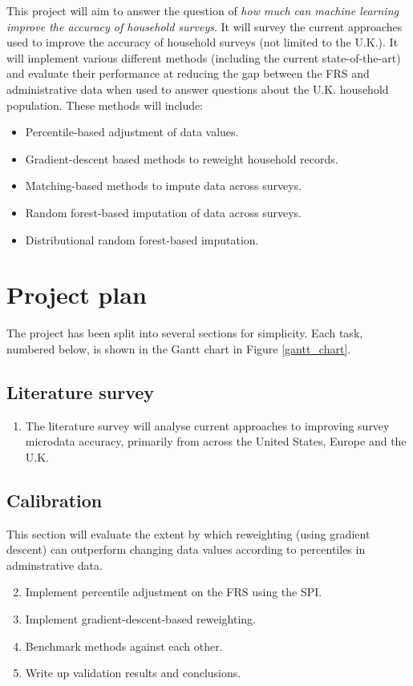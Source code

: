 \documentclass[twocolumn]{article}
\begin{document}
This project will aim to answer the question of \emph{how much can machine learning improve the accuracy of household surveys}. It will survey the current approaches used to improve the accuracy of household surveys (not limited to the U.K.). It will implement various different methods (including the current state-of-the-art) and evaluate their performance at reducing the gap between the FRS and administrative data when used to answer questions about the U.K. household population. These methods will include:
\begin{itemize}
    \item Percentile-based adjustment of data values.
    \item Gradient-descent based methods to reweight household records.
    \item Matching-based methods to impute data across surveys.
    \item Random forest-based imputation of data across surveys.
    \item Distributional random forest-based imputation.
\end{itemize}
\section{Project plan}

The project has been split into several sections for simplicity. Each task, numbered below, is shown in the Gantt chart in Figure \ref{gantt_chart}.

\subsection{Literature survey}

\begin{enumerate}
    \item The literature survey will analyse current approaches to improving survey microdata accuracy, primarily from across the United States, Europe and the U.K. 
\end{enumerate}

\subsection{Calibration}

This section will evaluate the extent by which reweighting (using gradient descent) can outperform changing data values according to percentiles in adminstrative data.

\begin{enumerate}
    \setcounter{enumi}{1}
    \item Implement percentile adjustment on the FRS using the SPI.
    \item Implement gradient-descent-based reweighting.
    \item Benchmark methods against each other.
    \item Write up validation results and conclusions.
\end{enumerate}
\end{document}

